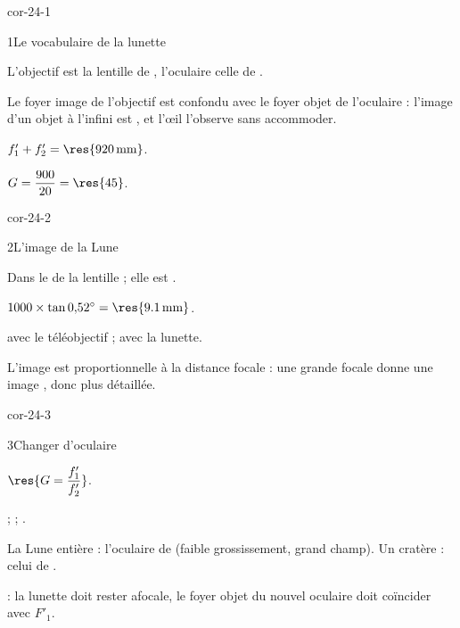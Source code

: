 \corrigesSouples

\begin{blocLivre}{cor-24-1}
\begin{corrige}{1}{Le vocabulaire de la lunette}
\begin{questions}
\item L'objectif est la lentille de , l'oculaire celle de .
\item Le foyer image de l'objectif est confondu avec le foyer objet de l'oculaire : l'image d'un objet à l'infini est
, et l'œil l'observe sans accommoder.
\item $f'_1+f'_2=\res{\qty{920}{mm}}$.
\item $G=\dfrac{900}{20}=\res{45}$.
\end{questions}
\end{corrige}
\end{blocLivre}
\begin{blocLivre}{cor-24-2}
\begin{corrige}{2}{L'image de la Lune}
\begin{questions}
\item Dans le  de la lentille ; elle est .
\item $1000\times\tan0{,}52^\circ=\res{\qty{9,1}{mm}}$.
\item {} avec le téléobjectif ;  avec la lunette.
\item L'image est proportionnelle à la distance focale : une grande focale donne une image , donc plus
détaillée.
\end{questions}
\end{corrige}
\end{blocLivre}
\begin{blocLivre}{cor-24-3}
\begin{corrige}{3}{Changer d'oculaire}
\begin{questions}
\item $\res{G=\dfrac{f'_1}{f'_2}}$.
\item {} ;  ; .
\item La Lune entière : l'oculaire de  (faible grossissement, grand champ). Un cratère : celui de
.
\item {} : la lunette doit rester afocale, le foyer objet du nouvel oculaire doit coïncider avec $F'_1$.
\end{questions}
\end{corrige}
\end{blocLivre}
